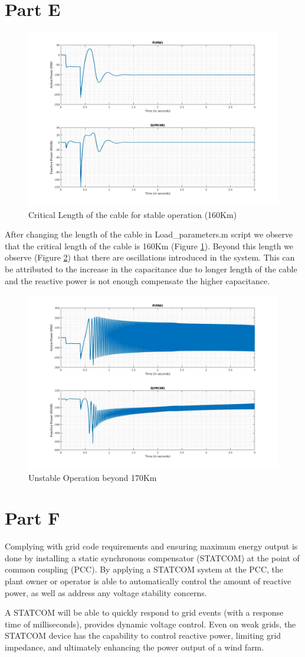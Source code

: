 \section*{Part E}
\begin{figure}[H]
    \centering
        \includegraphics[width=0.6 \linewidth]{images_a7/criticalLength_160Km_stable.jpg}
        \caption{Critical Length of the cable for stable operation (160Km)}
        \label{fig:crit_160}   
\end{figure}
After changing the length of the cable in Load\_parameters.m script we observe that the critical length of the cable is 160Km (Figure \ref{fig:crit_160}). Beyond this length we observe (Figure \ref{fig:crit_170}) that there are oscillations introduced in the system. This can be attributed to the increase in the capacitance due to longer length of the cable and the reactive power is not enough compensate the higher capacitance.
\begin{figure}[H]
    \centering
        \includegraphics[width=0.6 \linewidth]{images_a7/criticalLength_170Km_unstable.jpg}
        \caption{Unstable Operation beyond 170Km}
        \label{fig:crit_170}   
\end{figure}
\section*{Part F}
Complying with grid code requirements and ensuring maximum energy output is done by installing a static synchronous compensator (STATCOM) at the point of common coupling (PCC). By applying a STATCOM system at the PCC, the plant owner or operator is able to automatically control the amount of reactive power, as well as address any voltage stability concerns.

A STATCOM will be able to quickly respond to grid events (with a response time of milliseconds), provides dynamic voltage control. Even on weak grids, the STATCOM device has the capability to control reactive power, limiting grid impedance, and ultimately enhancing the power output of a wind farm.